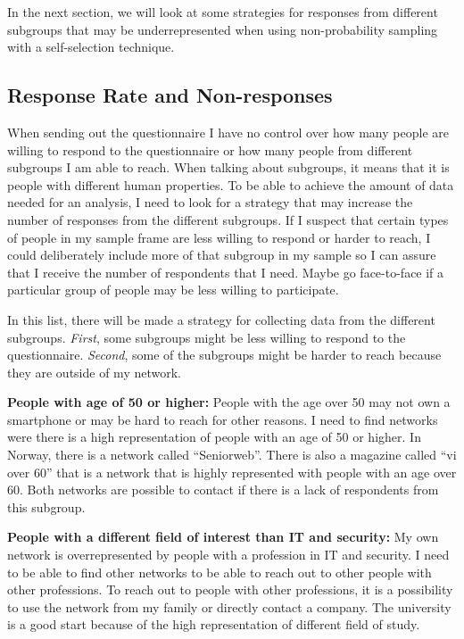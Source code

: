     In the next section, we will look at some strategies for responses from different subgroups that may be underrepresented when using non-probability sampling with a self-selection technique. 

    \subsection{Response Rate and Non-responses} \label{sec:response}

    When sending out the questionnaire I have no control over how many people are willing to respond to the questionnaire or how many people from different subgroups I am able to reach. When talking about subgroups, it means that it is people with different human properties. To be able to achieve the amount of data needed for an analysis, I need to look for a strategy that may increase the number of responses from the different subgroups. If I suspect that certain types of people in my sample frame are less willing to respond or harder to reach, I could deliberately include more of that subgroup in my sample so I can assure that I receive the number of respondents that I need. Maybe go face-to-face if a particular group of people may be less willing to participate.

    In this list, there will be made a strategy for collecting data from the different subgroups. {\it First}, some subgroups might be less willing to respond to the questionnaire. {\it Second}, some of the subgroups might be harder to reach because they are outside of my network.

    {\bf People with age of 50 or higher:} People with the age over 50 may not own a smartphone or may be hard to reach for other reasons. I need to find networks were there is a high representation of people with an age of 50 or higher. In Norway, there is a network called ``Seniorweb''. There is also a magazine called ``vi over 60'' that is a network that is highly represented with people with an age over 60. Both networks are possible to contact if there is a lack of respondents from this subgroup.

    {\bf People with a different field of interest than IT and security:} My own network is overrepresented by people with a profession in IT and security. I need to be able to find other networks to be able to reach out to other people with other professions. To reach out to people with other professions, it is a possibility to use the network from my family or directly contact a company. The university is a good start because of the high representation of different field of study.

